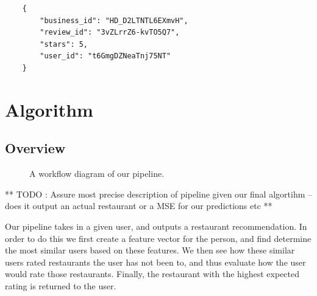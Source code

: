 \documentclass[10pt,twocolumn,letterpaper]{article}
\begin{document}
\begin{verbatim}
	{
	    "business_id": "HD_D2LTNTL6EXmvH",
	    "review_id": "3vZLrrZ6-kvTO5Q7",
	    "stars": 5,
	    "user_id": "t6GmgDZNeaTnj75NT"
	}
\end{verbatim}


\section{Algorithm}

\subsection{Overview}
\begin{figure}[t]
\begin{center}
\end{center}
   \caption{A workflow diagram of our pipeline.}
\label{fig:long}
\label{fig:onecol}
\end{figure}

** TODO : Assure most precise description of pipeline given our final algortihm -- does it output an actual restaurant or a MSE for our predictions etc **

Our pipeline takes in a given user, and outputs a restaurant recommendation. In order to do this we first create a feature vector for the person, and find determine the most similar users based on these features. We then see how these similar users rated restaurants the user has not been to, and thus evaluate how the user would rate those restaurants. Finally, the restaurant with the highest expected rating is returned to the user.
\end{document}
